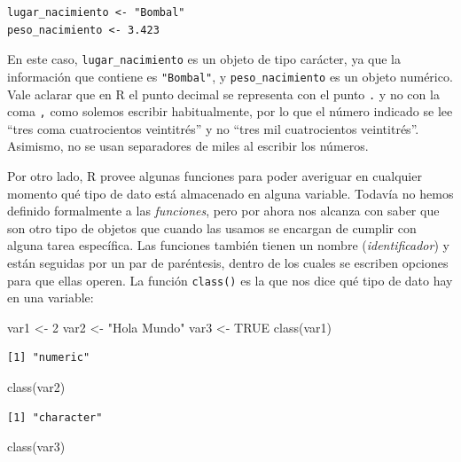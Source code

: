 \documentclass[
]{book}
\newenvironment{Shaded}{\begin{snugshade}}{\end{snugshade}}
\newcommand{\ConstantTok}[1]{\textcolor[rgb]{0.00,0.00,0.00}{#1}}
\newcommand{\DecValTok}[1]{\textcolor[rgb]{0.00,0.00,0.81}{#1}}
\newcommand{\FunctionTok}[1]{\textcolor[rgb]{0.00,0.00,0.00}{#1}}
\newcommand{\NormalTok}[1]{#1}
\newcommand{\OtherTok}[1]{\textcolor[rgb]{0.56,0.35,0.01}{#1}}
\newcommand{\StringTok}[1]{\textcolor[rgb]{0.31,0.60,0.02}{#1}}
\begin{document}
\begin{verbatim}
lugar_nacimiento <- "Bombal"
peso_nacimiento <- 3.423
\end{verbatim}

En este caso, \texttt{lugar\_nacimiento} es un objeto de tipo carácter, ya que la información que contiene es \texttt{"Bombal"}, y \texttt{peso\_nacimiento} es un objeto numérico. Vale aclarar que en R el punto decimal se representa con el punto \texttt{.} y no con la coma \texttt{,} como solemos escribir habitualmente, por lo que el número indicado se lee ``tres coma cuatrocientos veintitrés'' y no ``tres mil cuatrocientos veintitrés''. Asimismo, no se usan separadores de miles al escribir los números.

Por otro lado, R provee algunas funciones para poder averiguar en cualquier momento qué tipo de dato está almacenado en alguna variable. Todavía no hemos definido formalmente a las \emph{funciones}, pero por ahora nos alcanza con saber que son otro tipo de objetos que cuando las usamos se encargan de cumplir con alguna tarea específica. Las funciones también tienen un nombre (\emph{identificador}) y están seguidas por un par de paréntesis, dentro de los cuales se escriben opciones para que ellas operen. La función \texttt{class()} es la que nos dice qué tipo de dato hay en una variable:

\begin{Shaded}
\begin{Highlighting}[]
\NormalTok{var1 }\OtherTok{\textless{}{-}} \DecValTok{2}
\NormalTok{var2 }\OtherTok{\textless{}{-}} \StringTok{"Hola Mundo"}
\NormalTok{var3 }\OtherTok{\textless{}{-}} \ConstantTok{TRUE}
\FunctionTok{class}\NormalTok{(var1)}
\end{Highlighting}
\end{Shaded}

\begin{verbatim}
[1] "numeric"
\end{verbatim}

\begin{Shaded}
\begin{Highlighting}[]
\FunctionTok{class}\NormalTok{(var2)}
\end{Highlighting}
\end{Shaded}

\begin{verbatim}
[1] "character"
\end{verbatim}

\begin{Shaded}
\begin{Highlighting}[]
\FunctionTok{class}\NormalTok{(var3)}
\end{Highlighting}
\end{Shaded}
\end{document}
